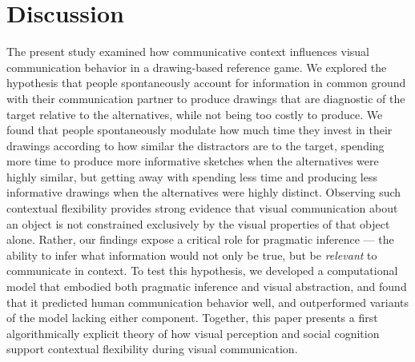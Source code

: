 \documentclass{svjour3}
\begin{document}

\section*{Discussion}

The present study examined how communicative context influences visual communication behavior in a drawing-based reference game. 
We explored the hypothesis that people spontaneously account for information in common ground with their communication partner to produce drawings that are diagnostic of the target relative to the alternatives, while not being too costly to produce. 
We found that people spontaneously modulate how much time they invest in their drawings according to how similar the distractors are to the target, spending more time to produce more informative sketches when the alternatives were highly similar, but getting away with spending less time and producing less informative drawings when the alternatives were highly distinct.
Observing such contextual flexibility provides strong evidence that visual communication about an object is not constrained exclusively by the visual properties of that object alone.  
Rather, our findings expose a critical role for pragmatic inference --- the ability to infer what information would not only be true, but be \textit{relevant} to communicate in context.
To test this hypothesis, we developed a computational model that embodied both pragmatic inference and visual abstraction, and found that it predicted human communication behavior well, and outperformed variants of the model lacking either component. 
Together, this paper presents a first algorithmically explicit theory of how visual perception and social cognition support contextual flexibility during visual communication.
\end{document}
